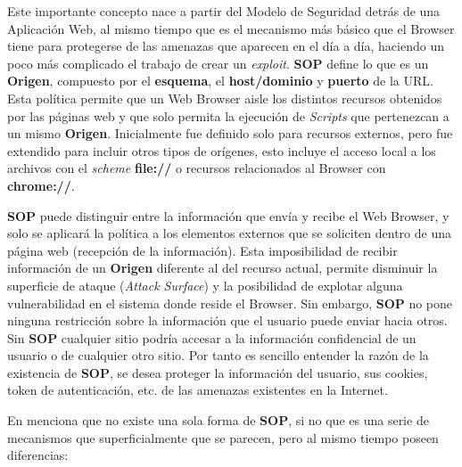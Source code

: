    Este importante concepto nace a partir del Modelo de Seguridad detrás de una Aplicación Web, al mismo tiempo que es el mecanismo más básico que el Browser tiene para protegerse de las amenazas que aparecen en el día a día, haciendo un poco más complicado el trabajo de crear un \textit{exploit}. \textbf{SOP} define lo que es un \textbf{Origen}, compuesto por el \textbf{esquema}, el \textbf{host/dominio} y \textbf{puerto} de la URL. Esta política permite que un Web Browser aisle los distintos recursos obtenidos por las páginas web y que solo permita la ejecución de \textit{Scripts} que pertenezcan a un mismo \textbf{Origen}. Inicialmente fue definido solo para recursos externos, pero fue extendido para incluir otros tipos de orígenes, esto incluye el acceso local a los archivos con el \textit{scheme} \textbf{file://} o recursos relacionados al Browser con \textbf{chrome://}.

    \textbf{SOP} puede distinguir entre la información que envía y recibe el Web Browser, y solo se aplicará la política a los elementos externos que se soliciten dentro de una página web (recepción de la información). Esta imposibilidad de recibir información de un \textbf{Origen} diferente al del recurso actual, permite disminuir la superficie de ataque (\textit{Attack Surface}) y la posibilidad de explotar alguna vulnerabilidad en el sistema donde reside el Browser. Sin embargo, \textbf{SOP} no pone ninguna restricción sobre la información que el usuario puede enviar hacia otros. Sin \textbf{SOP} cualquier sitio podría accesar a la información confidencial de un usuario o de cualquier otro sitio. Por tanto es sencillo entender la razón de la existencia de \textbf{SOP}, se desea proteger la información del usuario, sus cookies, token de autenticación, etc. de las amenazas existentes en la Internet.


    En \cite{Zalewsk08} menciona que no existe una sola forma de \textbf{SOP}, si no que es una serie de mecanismos que superficialmente que se parecen, pero al mismo tiempo poseen diferencias:

